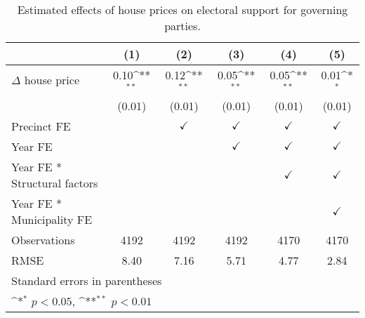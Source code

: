 \begin{table}[htbp]\centering
\def\sym#1{\ifmmode^{#1}\else\(^{#1}\)\fi}
\caption{Estimated effects of house prices on electoral support for governing parties.} \label{tab1}
\begin{tabular}{l*{5}{c}}
\hline\hline
                    &\multicolumn{1}{c}{(1)}        &\multicolumn{1}{c}{(2)}        &\multicolumn{1}{c}{(3)}        &\multicolumn{1}{c}{(4)}        &\multicolumn{1}{c}{(5)}        \\
\hline
$\Delta$ house price&        0.10\sym{**}&        0.12\sym{**}&        0.05\sym{**}&        0.05\sym{**}&        0.01\sym{*} \\
                    &      (0.01)        &      (0.01)        &      (0.01)        &      (0.01)        &      (0.01)        \\
[1em]
\hline Precinct FE  &                    &$\checkmark$        &$\checkmark$        &$\checkmark$        &$\checkmark$        \\
[1em]
Year FE             &                    &                    &$\checkmark$        &$\checkmark$        &$\checkmark$        \\
[1em]
Year FE * Structural factors&                    &                    &                    &$\checkmark$        &$\checkmark$        \\
[1em]
Year FE * Municipality FE&                    &                    &                    &                    &$\checkmark$        \\
\hline
Observations        &        4192        &        4192        &        4192        &        4170        &        4170        \\
RMSE                &        8.40        &        7.16        &        5.71        &        4.77        &        2.84        \\
\hline\hline
\multicolumn{6}{l}{\footnotesize Standard errors in parentheses}\\
\multicolumn{6}{l}{\footnotesize \sym{*} \(p<0.05\), \sym{**} \(p<0.01\)}\\
\end{tabular}
\end{table}
